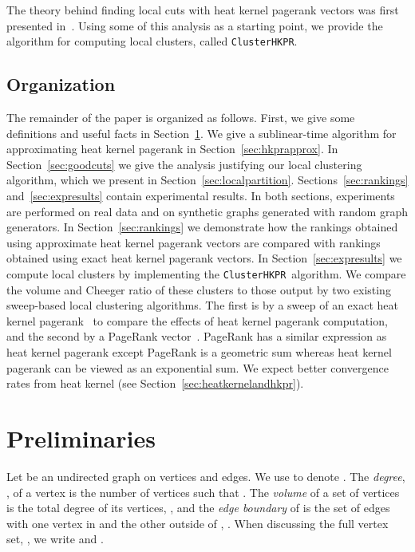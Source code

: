 \documentclass[runningheads,a4paper]{llncs}
\newcommand{\partitionalg}{\texttt{ClusterHKPR}}
\begin{document}
The theory behind finding local cuts with heat kernel pagerank vectors was first
presented in~\cite{chung:hkpr:07,chung:partitionhkpr:im09}.  Using some of this
analysis as a starting point, we provide the algorithm for computing local
clusters, called \partitionalg.

\subsection{Organization}
The remainder of the paper is organized as follows.  First, we give some
definitions and useful facts in Section~\ref{sec:preliminaries}.  We give a
sublinear-time algorithm for approximating heat kernel pagerank in
Section~\ref{sec:hkprapprox}.  In Section~\ref{sec:goodcuts} we give the
analysis justifying our local clustering algorithm, which we present in
Section~\ref{sec:localpartition}.  Sections~\ref{sec:rankings}
and~\ref{sec:expresults} contain experimental results.  In both sections,
experiments are performed on real data and on synthetic graphs generated with
random graph generators.  In Section~\ref{sec:rankings} we demonstrate how the
rankings obtained using approximate heat kernel pagerank vectors are compared
with rankings obtained using exact heat kernel pagerank vectors.  In
Section~\ref{sec:expresults} we compute local clusters by implementing the
\partitionalg~algorithm.  We compare the volume and Cheeger ratio of these
clusters to those output by two existing sweep-based local clustering
algorithms.  The first is by a sweep of an exact heat kernel
pagerank~\cite{chung:partitionhkpr:im09} to compare the effects of heat kernel
pagerank computation, and the second by a PageRank
vector~\cite{acl:prgraphpartition:focs06}.  PageRank has a similar expression as
heat kernel pagerank except PageRank is a geometric sum whereas heat kernel
pagerank can be viewed as an exponential sum.  We expect better convergence
rates from heat kernel (see Section~\ref{sec:heatkernelandhkpr}).

\section{Preliminaries}
\label{sec:preliminaries}
Let  be an undirected graph on  vertices and  edges.  We use  to denote .  The \emph{degree}, , of a vertex  is
the number of vertices  such that .  The \emph{volume} of a set of
vertices  is the total degree of its vertices, , and the \emph{edge boundary} of  is the set of edges with one
vertex in  and the other outside of , . When discussing the full vertex set, , we write
 and .
\end{document}
